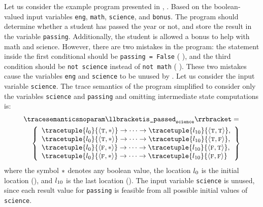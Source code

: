\begin{example}
Let us consider the example program presented in \textcite{Urban2018}, \cf{} .
Based on the boolean-valued input variables \texttt{eng}, \texttt{math}, \texttt{science}, and \texttt{bonus}.
The program should determine whether a student has passed the year or not, and store the result in the variable \texttt{passing}. Additionally, the student is allowed a bonus to help with math and science.
However, there are two mistakes in the program: the statement inside the first conditional should be \texttt{passing = False} (\cf{} ), and the third condition should be \texttt{not science} instead of \texttt{not math} (\cf{} ).
These two mistakes cause the variables \texttt{eng} and \texttt{science} to be unused by .
Let us consider the input variable \texttt{science}.
The trace semantics of the program simplified to consider only the variables \texttt{science} and \texttt{passing} and omitting intermediate state computations is:
\begin{align*}
  &{\tracesemanticsnoparam\semanticsof{\texttt{is\_passed}_\texttt{science}}
  =}\\
  &\quad\left\{
    \begin{array}{l}
      \tracetuple{\locinit}{\tuple{\true}{\anyvalue}}\tracearrow\tracetuple{\loc{10}}{\tuple{\true}{\true}}, \\
      \tracetuple{\locinit}{\tuple{\true}{\anyvalue}}\tracearrow\tracetuple{\loc{10}}{\tuple{\true}{\false}}, \\
      \tracetuple{\locinit}{\tuple{\false}{\anyvalue}}\tracearrow\tracetuple{\loc{10}}{\tuple{\false}{\true}}, \\
      \tracetuple{\locinit}{\tuple{\false}{\anyvalue}}\tracearrow\tracetuple{\loc{10}}{\tuple{\false}{\false}}
    \end{array}
  \right\}
\end{align*}
where the symbol ${*}$ denotes any boolean value, the location $l_{0}$ is the initial location (), and $l_{10}$ is the last location ().
The input variable \texttt{science} is unused, since each result value for \texttt{passing} is feasible from all possible initial values of \texttt{science}.


\end{example}

